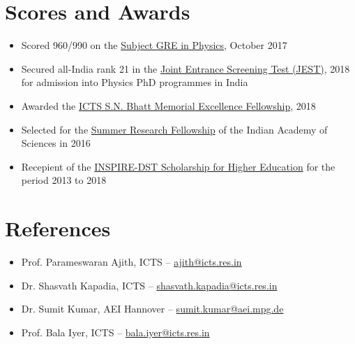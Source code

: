 \documentclass[margin, centered]{res}
\begin{document}
\begin{resume}
\section{Scores and Awards}
\begin{itemize}[leftmargin=*]
 \item Scored 960/990 on the \href{https://www.ets.org/gre/subject/about/content/physics}{Subject GRE in Physics}, October 2017
 \item Secured all-India rank 21 in the \href{https://www.jest.org.in/}{Joint Entrance Screening Test (JEST)}, 2018 for admission into Physics PhD programmes in India
 \item Awarded the \href{https://www.icts.res.in/academic/summer-research-program}{ICTS S.N. Bhatt Memorial Excellence Fellowship}, 2018
 \item Selected for the \href{http://web-japps.ias.ac.in:8080/fellowship2018/}{Summer Research Fellowship} of the Indian Academy of Sciences in 2016
 \item Recepient of the \href{http://www.inspire-dst.gov.in/scholarship.html}{INSPIRE-DST Scholarship for Higher Education} for the period 2013 to 2018
\end{itemize}

\section{References}
\begin{itemize}[leftmargin=*]
 \item Prof. Parameswaran Ajith, ICTS -- \href{mailto:ajith@icts.res.in}{ajith@icts.res.in}
 \item Dr. Shasvath Kapadia, ICTS -- \href{mailto:shasvath.kapadia@icts.res.in}{shasvath.kapadia@icts.res.in}
 \item Dr. Sumit Kumar, AEI Hannover -- \href{mailto:sumit.kumar@aei.mpg.de}{sumit.kumar@aei.mpg.de}
 \item Prof. Bala Iyer, ICTS -- \href{mailto:bala.iyer@icts.res.in}{bala.iyer@icts.res.in}
\end{itemize}

\end{resume}
\end{document}
